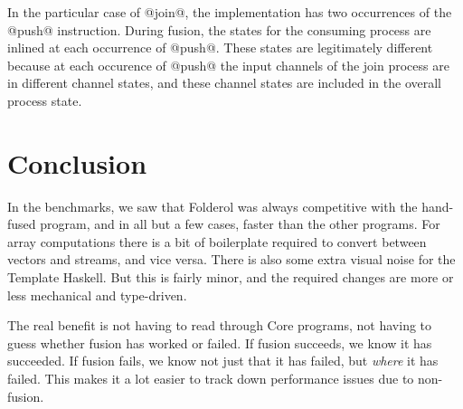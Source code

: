 In the particular case of @join@, the implementation has two occurrences of the @push@ instruction. During fusion, the states for the consuming process are inlined at each occurrence of @push@. These states are legitimately different because at each occurence of @push@ the input channels of the join process are in different channel states, and these channel states are included in the overall process state.


\section{Conclusion}
In the benchmarks, we saw that Folderol was always competitive with the hand-fused program, and in all but a few cases, faster than the other programs.
For array computations there is a bit of boilerplate required to convert between vectors and streams, and vice versa.
There is also some extra visual noise for the Template Haskell.
But this is fairly minor, and the required changes are more or less mechanical and type-driven.

The real benefit is not having to read through Core programs, not having to guess whether fusion has worked or failed.
If fusion succeeds, we know it has succeeded.
If fusion fails, we know not just that it has failed, but \emph{where} it has failed.
This makes it a lot easier to track down performance issues due to non-fusion.

